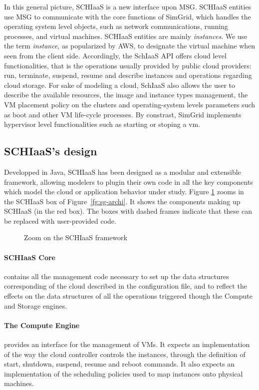 In this general  picture, SCHIaaS is a new interface  upon MSG. SCHIaaS entities
use MSG  to communicate with  the core functions  of SimGrid, which  handles the
operating  system  level  objects,   such  as  network  communications,  running
processes, and  virtual machines. SCHIaaS entities  are mainly \emph{instances}.
We use the term \emph{instance}, as popularized by AWS, to designate the virtual
machine when  seen from  the client  side. Accordingly,  the SchIaaS  API offers
cloud level functionalities,  that is the operations usually  provided by public
cloud  providers: run,  terminate, suspend,  resume and  describe instances  and
operations regarding cloud  storage. For sake of modeling a  cloud, SchIaaS also
allows the  user to  describe the  available resources,  the image  and instance
types management, the  VM placement policy on the  clusters and operating-system
levels parameters such as boot and other VM life-cycle processes.  By constrast,
SimGrid implements hypervisor level functionalities  such as starting or stoping
a \ac{vm}.


\subsection{SCHIaaS's design}

Developped  in Java,  SCHIaaS  has been  designed as  a  modular and  extensible
framework, allowing modelers to plugin their  own code in all the key components
which model  the cloud  or application behavior  under study.   Figure \ref{fg:}
zooms in  the SCHIaaS box  of Figure~\ref{fg:sg-archi}. It shows  the components
making up SCHIaaS (in  the red box). The boxes with  dashed frames indicate that
these can be replaced with user-provided code.
%
\begin{figure}[hbt]
\centering
\resizebox{.7\textwidth}{!}{%

}
\caption{Zoom on the SCHIaaS framework}
\label{fg:}
\end{figure}
%
\paragraph{SCHIaaS Core} contains all the management code necessary to set up the data
  structures corresponding of the cloud described in the configuration file, and
  to reflect the effects on the  data structures of all the operations triggered
  though the Compute and Storage engines.

\paragraph{The  Compute Engine} provides  an interface for  the management of  VMs. It
  expects  an  implementation of  the  way  the  cloud controller  controls  the
  instances,  through the  definition of  start, shutdown,  suspend, resume  and
  reboot commands. It also expects  an implementation of the scheduling policies
  used to map instances onto physical machines.


